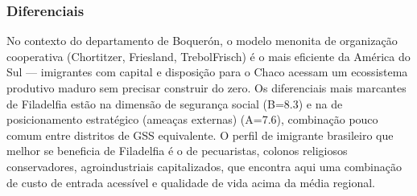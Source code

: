 \subsubsection*{Diferenciais}\label{dif-filadelfia-1604}
No contexto do departamento de Boquerón, o modelo menonita de organização cooperativa (Chortitzer, Friesland, TrebolFrisch) é o mais eficiente da América do Sul — imigrantes com capital e disposição para o Chaco acessam um ecossistema produtivo maduro sem precisar construir do zero. Os diferenciais mais marcantes de Filadelfia estão na dimensão de segurança social (B=8.3) e na de posicionamento estratégico (ameaças externas) (A=7.6), combinação pouco comum entre distritos de GSS equivalente. O perfil de imigrante brasileiro que melhor se beneficia de Filadelfia é o de pecuaristas, colonos religiosos conservadores, agroindustriais capitalizados, que encontra aqui uma combinação de custo de entrada acessível e qualidade de vida acima da média regional.
